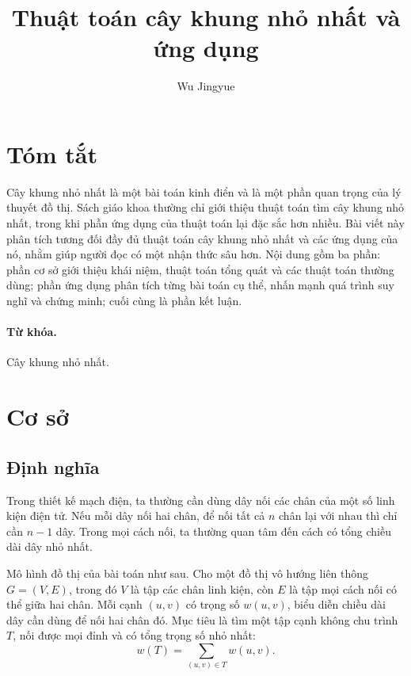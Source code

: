 \documentclass[11pt]{article}
\title{Thuật toán cây khung nhỏ nhất và ứng dụng}
\author{Wu Jingyue}
\date{}
\begin{document}
\maketitle


\section*{Tóm tắt}

Cây khung nhỏ nhất là một bài toán kinh điển và là một phần quan trọng của lý
thuyết đồ thị. Sách giáo khoa thường chỉ giới thiệu thuật toán tìm cây khung
nhỏ nhất, trong khi phần ứng dụng của thuật toán lại đặc sắc hơn nhiều. Bài
viết này phân tích tương đối đầy đủ thuật toán cây khung nhỏ nhất và các ứng
dụng của nó, nhằm giúp người đọc có một nhận thức sâu hơn. Nội dung gồm ba
phần: phần cơ sở giới thiệu khái niệm, thuật toán tổng quát và các thuật toán
thường dùng; phần ứng dụng phân tích từng bài toán cụ thể, nhấn mạnh quá trình
suy nghĩ và chứng minh; cuối cùng là phần kết luận.

\paragraph{Từ khóa.}
Cây khung nhỏ nhất.

\section{Cơ sở}

\subsection{Định nghĩa}

Trong thiết kế mạch điện, ta thường cần dùng dây nối các chân của một số linh
kiện điện tử. Nếu mỗi dây nối hai chân, để nối tất cả $n$ chân lại với nhau
thì chỉ cần $n-1$ dây. Trong mọi cách nối, ta thường quan tâm đến cách có tổng
chiều dài dây nhỏ nhất.

Mô hình đồ thị của bài toán như sau. Cho một đồ thị vô hướng liên thông
$G=(V,E)$, trong đó $V$ là tập các chân linh kiện, còn $E$ là tập mọi cách nối
có thể giữa hai chân. Mỗi cạnh $(u,v)$ có trọng số $w(u,v)$, biểu diễn chiều
dài dây cần dùng để nối hai chân đó. Mục tiêu là tìm một tập cạnh không chu
trình $T$, nối được mọi đỉnh và có tổng trọng số nhỏ nhất:
\[
  w(T)=\sum_{(u,v)\in T} w(u,v).
\]
\end{document}
